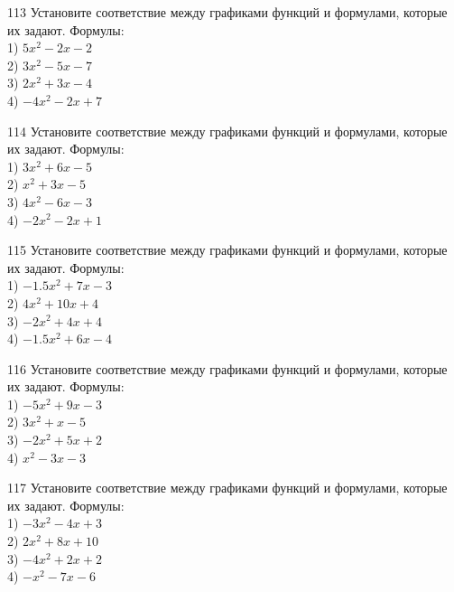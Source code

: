 \documentclass[4apaper]{article}
\begin{document}
\begin{taskBN}{113}
Установите соответствие между графиками функций и формулами, которые их задают. Формулы: \\1) $5x^2-2x-2$\\2) $3x^2-5x-7$\\3) $2x^2+3x-4$\\4) $-4x^2-2x+7$
\end{taskBN}

\begin{taskBN}{114}
Установите соответствие между графиками функций и формулами, которые их задают. Формулы: \\1) $3x^2+6x-5$\\2) $x^2+3x-5$\\3) $4x^2-6x-3$\\4) $-2x^2-2x+1$
\end{taskBN}

\begin{taskBN}{115}
Установите соответствие между графиками функций и формулами, которые их задают. Формулы: \\1) $-1.5x^2+7x-3$\\2) $4x^2+10x+4$\\3) $-2x^2+4x+4$\\4) $-1.5x^2+6x-4$
\end{taskBN}

\begin{taskBN}{116}
Установите соответствие между графиками функций и формулами, которые их задают. Формулы: \\1) $-5x^2+9x-3$\\2) $3x^2+x-5$\\3) $-2x^2+5x+2$\\4) $x^2-3x-3$
\end{taskBN}

\begin{taskBN}{117}
Установите соответствие между графиками функций и формулами, которые их задают. Формулы: \\1) $-3x^2-4x+3$\\2) $2x^2+8x+10$\\3) $-4x^2+2x+2$\\4) $-x^2-7x-6$
\end{taskBN}
\end{document}
